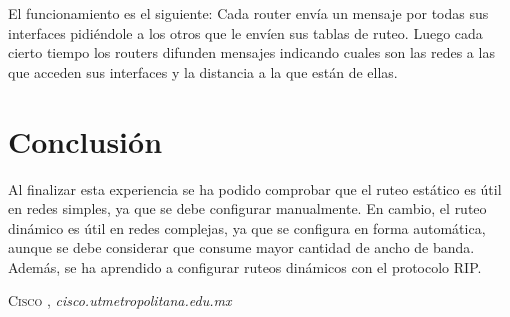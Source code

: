 \documentclass{udpreport}
\begin{document}
\begin{enumerate}
            	El funcionamiento es el siguiente: Cada router envía un mensaje por todas sus interfaces pidiéndole a los otros que le envíen sus tablas de ruteo. Luego cada cierto tiempo los routers difunden mensajes indicando cuales son las redes a las que acceden sus interfaces y la distancia a la que están de ellas.
 
  	     
	\end{enumerate}
	
    
	
\chapter{Conclusión}
 Al finalizar esta experiencia se ha podido comprobar que el ruteo estático es útil en redes simples, ya que se debe configurar
 manualmente. En cambio, el ruteo dinámico es útil en redes complejas, ya que se configura en forma automática, aunque se debe
 considerar que consume mayor cantidad de ancho de banda. Además, se ha aprendido a configurar ruteos dinámicos con el protocolo RIP.\\
\begin{thebibliography}{x}
 \textsc{Cisco },
\textit{cisco.utmetropolitana.edu.mx}

\end{thebibliography}
\end{document}
